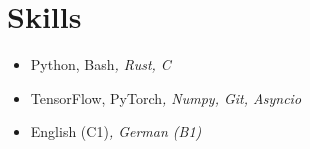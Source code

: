 \section*{Skills}
\begin{itemize}[itemsep=0mm]

    \item {} Python, Bash\textit{, Rust, C}
    \item {} TensorFlow, PyTorch\textit{, Numpy, Git, Asyncio}
    \item {} English (C1)\textit{, German (B1)}

\end{itemize}
